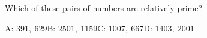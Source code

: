 Which of these pairs of numbers are relatively prime?

A: $391,\ 629$\qquad B: $2501,\ 1159$\qquad C: $1007,\ 667$\qquad D: $1403,\ 2001$
